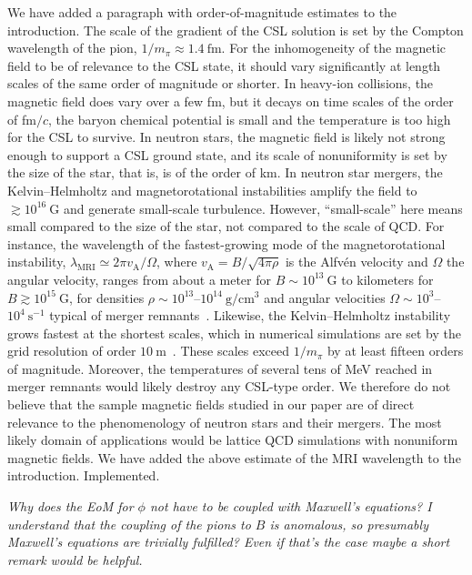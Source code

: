 \documentclass[11pt,a4paper]{article}
\newcommand{\impl}{\textcolor{green!60!black}{Implemented.}}
\newcommand{\referee}[1]{\medskip\noindent{\sffamily\large #1)~Referee:}\par\smallskip}
\newcommand{\reply}{\par\medskip\noindent{\sffamily\large Reply:}\par\smallskip\noindent}
\newenvironment{reftext}{\itshape}{\par}
\begin{document}
\reply
We have added a paragraph with order-of-magnitude estimates to the introduction. The scale of the gradient of the CSL solution is set by the Compton wavelength of the pion, $1/m_\pi\approx1.4~\text{fm}$. For the inhomogeneity of the magnetic field to be of relevance to the CSL state, it should vary significantly at length scales of the same order of magnitude or shorter. In heavy-ion collisions, the magnetic field does vary over a few fm, but it decays on time scales of the order of fm$/c$, the baryon chemical potential is small and the temperature is too high for the CSL to survive. In neutron stars, the magnetic field is likely not strong enough to support a CSL ground state, and its scale of nonuniformity is set by the size of the star, that is, is of the order of km. In neutron star mergers, the Kelvin--Helmholtz and magnetorotational instabilities amplify the field to $\gtrsim10^{16}~\text{G}$ and generate small-scale turbulence. However, ``small-scale'' here means small compared to the size of the star, not compared to the scale of QCD. For instance, the wavelength of the fastest-growing mode of the magnetorotational instability, $\lambda_\text{MRI}\simeq2\pi v_\text{A}/\Omega$, where $v_\text{A}=B/\sqrt{4\pi\rho}$ is the Alfv\'en velocity and $\Omega$ the angular velocity, ranges from about a meter for $B\sim10^{13}~\text{G}$ to kilometers for $B\gtrsim10^{15}~\text{G}$, for densities $\rho\sim10^{13}$--$10^{14}~\text{g}/\text{cm}^3$ and angular velocities $\Omega\sim10^3$--$10^4~\text{s}^{-1}$ typical of merger remnants~\cite{Siegel2013MRI,Guilet2017MRI}. Likewise, the Kelvin--Helmholtz instability grows fastest at the shortest scales, which in numerical simulations are set by the grid resolution of order $10~\text{m}$~\cite{Kiuchi:2015sga}. These scales exceed $1/m_\pi$ by at least fifteen orders of magnitude. Moreover, the temperatures of several tens of MeV reached in merger remnants would likely destroy any CSL-type order. We therefore do not believe that the sample magnetic fields studied in our paper are of direct relevance to the phenomenology of neutron stars and their mergers. The most likely domain of applications would be lattice QCD simulations with nonuniform magnetic fields. We have added the above estimate of the MRI wavelength to the introduction. \impl

\referee{5}
\begin{reftext}
Why does the EoM for $\phi$ not have to be coupled with Maxwell's equations? I understand that the coupling of the pions to $B$ is anomalous, so presumably Maxwell's equations are trivially fulfilled? Even if that's the case maybe a short remark would be helpful.
\end{reftext}
\end{document}
